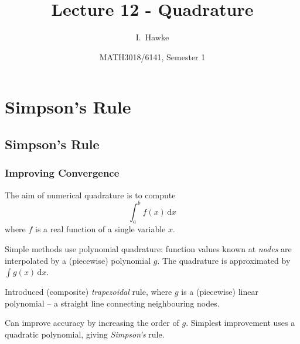 \documentclass{beamer}
\title[Lecture 12] %
{Lecture 12 - Quadrature}
\author[I. Hawke] %
{I.~Hawke}
\institute[University of Southampton] %
{
  School of Mathematics, \\
  University of Southampton, UK
}
\date[Semester 1] %
{MATH3018/6141, Semester 1}
\begin{document}
\begin{frame}
  \titlepage
\end{frame}

\section{Simpson's Rule}

\subsection{Simpson's Rule}

\begin{frame}
  \frametitle{Improving Convergence}

  The aim of numerical quadrature is to compute
  \begin{equation*}
    \int_a^b f(x) \, \text{d}x
  \end{equation*}
  where $f$ is a real function of a single variable $x$.

  \vspace{1ex}

  Simple methods use polynomial quadrature: function values known
  at \emph{nodes} are interpolated by a (piecewise) polynomial $g$. The
  quadrature is approximated by $\int g(x) \, \text{d}x$. \pause

  \vspace{1ex}

  Introduced (composite) \emph{trapezoidal} rule, where $g$ is a
  (piecewise) linear polynomial -- a straight line connecting
  neighbouring nodes. \pause

  \vspace{1ex}

  Can improve accuracy by increasing the order of $g$.  Simplest
  improvement uses a quadratic polynomial, giving \emph{Simpson's}
  rule.

\end{frame}
\end{document}
